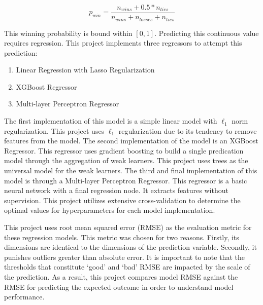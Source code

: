 \documentclass[conference]{IEEEtran}
\begin{document}
\begin{equation}
        p_{win}=\frac{n_{wins} + 0.5*n_{ties}}{n_{wins} + n_{losses} + n_{ties}}
        \label{eq1}
\end{equation}

This winning probability is bound within $[0, 1]$. Predicting this continuous value requires regression. This project implements three regressors to attempt this prediction: 
\begin{enumerate}
  \item Linear Regression with Lasso Regularization\cite{b7}
  \item XGBoost Regressor\cite{b8}
  \item Multi-layer Perceptron Regressor\cite{b7}
\end{enumerate}

The first implementation of this model is a simple linear model with $\ell_1$ norm regularization. This project uses $\ell_1$ regularization due to its tendency to remove features from the model. The second implementation of the model is an XGBoost Regressor. This regressor uses gradient boosting to build a single predication model through the aggregation of weak learners. This project uses trees as the universal model for the weak learners. The third and final implementation of this model is through a Multi-layer Perceptron Regressor. This regressor is a basic neural network with a final regression node. It extracts features without supervision. This project utilizes extensive cross-validation to determine the optimal values for hyperparameters for each model implementation. 

This project uses root mean squared error (RMSE) as the evaluation metric for these regression models. This metric was chosen for two reasons. Firstly, its dimensions are identical to the dimensions of the prediction variable. Secondly, it punishes outliers greater than absolute error. It is important to note that the thresholds that constitute `good' and `bad' RMSE are impacted by the scale of the prediction. As a result, this project compares model RMSE against the RMSE for predicting the expected outcome in order to understand model performance. 
\end{document}
